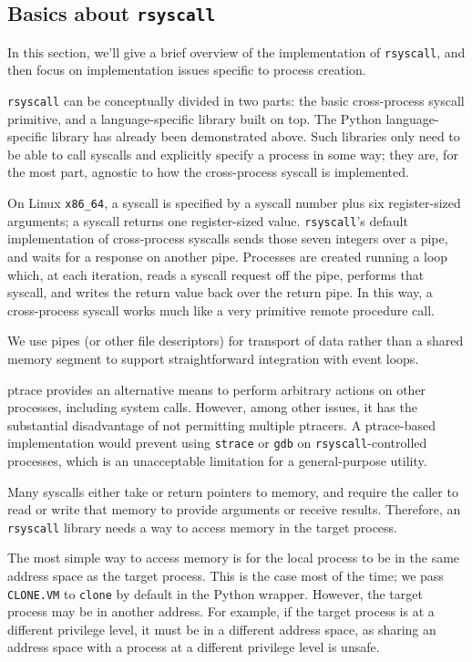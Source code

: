 \documentclass[letterpaper,twocolumn,10pt]{article}
\begin{document}
\subsection{Basics about \texttt{rsyscall}}
In this section, we'll give a brief overview of the implementation of \texttt{rsyscall},
and then focus on implementation issues specific to process creation.

\texttt{rsyscall} can be conceptually divided in two parts:
the basic cross-process syscall primitive,
and a language-specific library built on top.
The Python language-specific library has already been demonstrated above.
Such libraries only need to be able to call syscalls and explicitly specify a process in some way;
they are, for the most part, agnostic to how the cross-process syscall is implemented.

On Linux \verb|x86_64|, a syscall is specified by a syscall number plus six register-sized arguments;
a syscall returns one register-sized value.
\texttt{rsyscall}'s default implementation of cross-process syscalls sends those seven integers over a pipe,
and waits for a response on another pipe.
Processes are created running a loop which, at each iteration,
reads a syscall request off the pipe,
performs that syscall,
and writes the return value back over the return pipe.
In this way, a cross-process syscall works much like a very primitive remote procedure call.

We use pipes (or other file descriptors) for transport of data rather than a shared memory segment
to support straightforward integration with event loops.

ptrace provides an alternative means to perform arbitrary actions on other processes,
including system calls.
However, among other issues, it has the substantial disadvantage of not permitting multiple ptracers.
A ptrace-based implementation would prevent using \texttt{strace} or \texttt{gdb} on \texttt{rsyscall}-controlled processes,
which is an unacceptable limitation for a general-purpose utility.

Many syscalls either take or return pointers to memory,
and require the caller to read or write that memory to provide arguments or receive results.
Therefore, an \texttt{rsyscall} library needs a way to access memory in the target process.

The most simple way to access memory is for the local process to be in the same address space as the target process.
This is the case most of the time; we pass \texttt{CLONE.VM} to \texttt{clone} by default in the Python wrapper.
However, the target process may be in another address.
For example, if the target process is at a different privilege level,
it must be in a different address space,
as sharing an address space with a process at a different privilege level is unsafe.
\end{document}
